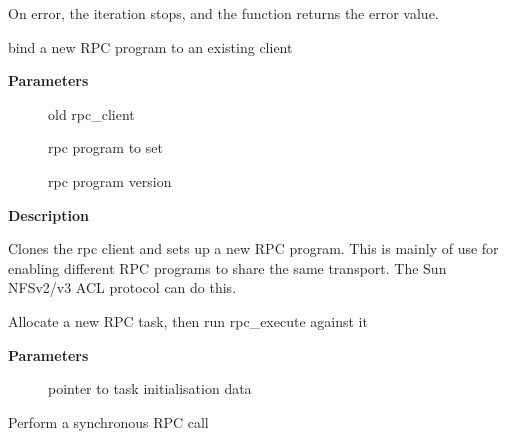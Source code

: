 \documentclass[a4paper,8pt,english]{sphinxmanual}
\begin{document}
On error, the iteration stops, and the function returns the error value.

\begin{fulllineitems}
\label{networking/kapi:c.rpc_bind_new_program}
bind a new RPC program to an existing client

\end{fulllineitems}


\textbf{Parameters}
\begin{description}
\item[{}] \leavevmode
old rpc\_client

\item[{}] \leavevmode
rpc program to set

\item[{}] \leavevmode
rpc program version

\end{description}

\textbf{Description}

Clones the rpc client and sets up a new RPC program. This is mainly
of use for enabling different RPC programs to share the same transport.
The Sun NFSv2/v3 ACL protocol can do this.

\begin{fulllineitems}
\label{networking/kapi:c.rpc_run_task}
Allocate a new RPC task, then run rpc\_execute against it

\end{fulllineitems}


\textbf{Parameters}
\begin{description}
\item[{}] \leavevmode
pointer to task initialisation data

\end{description}

\begin{fulllineitems}
\label{networking/kapi:c.rpc_call_sync}
Perform a synchronous RPC call

\end{fulllineitems}
\end{document}
